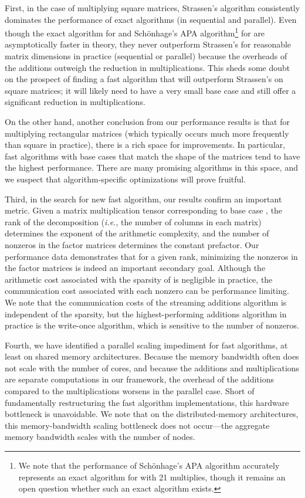 \documentclass[preprint]{sigplanconf}
\begin{document}
First, in the case of multiplying square matrices, Strassen's algorithm consistently dominates the performance of exact algorithms (in sequential and parallel).
Even though the exact algorithm for  and Sch\"{o}nhage's APA algorithm\footnote{We note that the performance of Sch\"{o}nhage's APA algorithm accurately represents an exact algorithm for  with 21 multiplies, though it remains an open question whether such an exact algorithm exists.} for  are asymptotically faster in theory, they never outperform Strassen's for reasonable matrix dimensions in practice (sequential or parallel) because the overheads of the additions outweigh the reduction in multiplications.
This sheds some doubt on the prospect of finding a fast algorithm that will outperform Strassen's on square matrices; it will likely need to have a very small base case and still offer a significant reduction in multiplications.

On the other hand, another conclusion from our performance results is that for multiplying rectangular matrices (which typically occurs much more frequently than square in practice), there is a rich space for improvements.
In particular, fast algorithms with base cases that match the shape of the matrices tend to have the highest performance.
There are many promising algorithms in this space, and we suspect that algorithm-specific optimizations will prove fruitful.

Third, in the search for new fast algorithm, our results confirm an important metric.
Given a matrix multiplication tensor corresponding to base case , the rank of the decomposition  (\emph{i.e.}, the number of columns in each matrix) determines the exponent of the arithmetic complexity, and the number of nonzeros in the factor matrices determines the constant prefactor.
Our performance data demonstrates that for a given rank, minimizing the nonzeros in the factor matrices is indeed an important secondary goal.
Although the arithmetic cost associated with the sparsity of  is negligible in practice, the communication cost associated with each nonzero can be performance limiting.
We note that the communication costs of the streaming additions algorithm is independent of the sparsity, but the highest-performing additions algorithm in practice is the write-once algorithm, which is sensitive to the number of nonzeros.

Fourth, we have identified a parallel scaling impediment for fast algorithms, at least on shared memory architectures. 
Because the memory bandwidth often does not scale with the number of cores, and because the additions and multiplications are separate computations in our framework, the overhead of the additions compared to the multiplications worsens in the parallel case.
Short of fundamentally restructuring the fast algorithm implementations, this hardware bottleneck is unavoidable.
We note that on the distributed-memory architectures, this memory-bandwidth scaling bottleneck does not occur---the aggregate memory bandwidth scales with the number of nodes.
\end{document}
